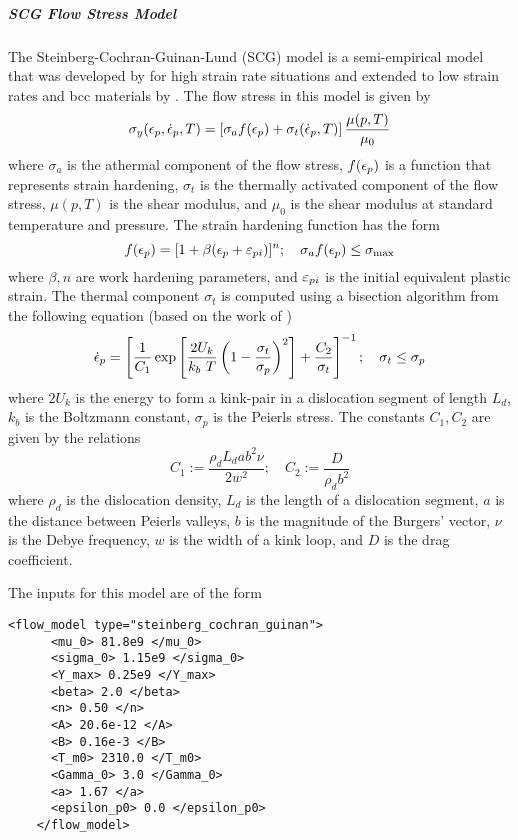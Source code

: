   \subparagraph{SCG Flow Stress Model}
  The Steinberg-Cochran-Guinan-Lund (SCG) model is a semi-empirical model
  that was developed by \cite{Steinberg80} for high strain rate
  situations and extended to low strain rates and bcc materials by
  \cite{Steinberg89}.  The flow stress in this model is given by
  \begin{equation}\label{eq:SCGL}
    \sigma_y(\Ep,\Epdot{},T) = 
     \left[\sigma_a f(\Ep) + \sigma_t (\Epdot{}, T)\right]
     \frac{\mu(p,T)}{\mu_0} 
  \end{equation}
  where $\sigma_a$ is the athermal component of the flow stress,
  $f(\Ep)$ is a function that represents strain hardening,
  $\sigma_t$ is the thermally activated component of the flow stress,
  $\mu(p,T)$ is the shear modulus, and $\mu_0$ is the shear modulus
  at standard temperature and pressure.  The strain hardening function
  has the form
  \begin{equation}
    f(\Ep) = [1 + \beta(\Ep + \Epi)]^n ; \quad
    \sigma_a f(\Ep) \le \sigma_{\text{max}}
  \end{equation}
  where $\beta, n$ are work hardening parameters, and $\Epi$ is the
  initial equivalent plastic strain.  The thermal component $\sigma_t$
  is computed using a bisection algorithm from the following equation (based
  on the work of \cite{Hoge77})
  \begin{equation}
    \Epdot{} = \left[\frac{1}{C_1}\exp\left[\frac{2U_k}{k_b~T}
      \left(1 - \frac{\sigma_t}{\sigma_p}\right)^2\right] + 
      \frac{C_2}{\sigma_t}\right]^{-1}; \quad
    \sigma_t \le \sigma_p
  \end{equation}
  where $2 U_k$ is the energy to form a kink-pair in a dislocation segment
  of length $L_d$, $k_b$ is the Boltzmann constant, $\sigma_p$ is the Peierls
  stress. The constants $C_1, C_2$ are given by the relations
  \begin{equation}
    C_1 := \frac{\rho_d L_d a b^2 \nu}{2 w^2}; \quad
    C_2 := \frac{D}{\rho_d b^2}
  \end{equation}
  where $\rho_d$ is the dislocation density, $L_d$ is the length of a
  dislocation segment, $a$ is the distance between Peierls valleys,
  $b$ is the magnitude of the Burgers' vector, $\nu$ is the Debye frequency,
  $w$ is the width of a kink loop, and $D$ is the drag coefficient.

  The inputs for this model are of the form
  \begin{Verbatim}[fontsize=\footnotesize]
    <flow_model type="steinberg_cochran_guinan">
      <mu_0> 81.8e9 </mu_0>
      <sigma_0> 1.15e9 </sigma_0>
      <Y_max> 0.25e9 </Y_max>
      <beta> 2.0 </beta>
      <n> 0.50 </n>
      <A> 20.6e-12 </A>
      <B> 0.16e-3 </B>
      <T_m0> 2310.0 </T_m0>
      <Gamma_0> 3.0 </Gamma_0>
      <a> 1.67 </a>
      <epsilon_p0> 0.0 </epsilon_p0>
    </flow_model>
  \end{Verbatim}

